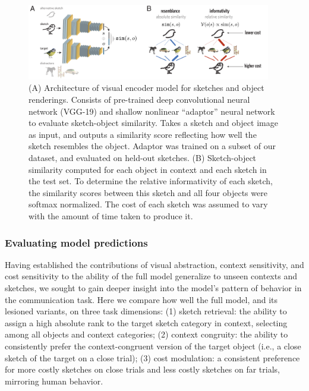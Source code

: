\documentclass[9pt,twocolumn,twoside]{pnas-new}
\begin{document}
\begin{figure}[htbp]
\centering
\includegraphics[width=0.95\textwidth]{figures/4_model_schematic.pdf}
\caption{(A) Architecture of visual encoder model for sketches and object renderings. Consists of pre-trained deep convolutional neural network (VGG-19) and shallow nonlinear ``adaptor'' neural network to evaluate sketch-object similarity. Takes a sketch and object image as input, and outputs a similarity score reflecting how well the sketch resembles the object. Adaptor was trained on a subset of our dataset, and evaluated on held-out sketches. (B) Sketch-object similarity computed for each object in context and each sketch in the test set. To determine the relative informativity of each sketch, the similarity scores between this sketch and all four objects were softmax normalized. The cost of each sketch was assumed to vary with the amount of time taken to produce it.}
\label{model_schematic}
\end{figure}



\subsubsection*{Evaluating model predictions}

Having established the contributions of visual abstraction, context sensitivity, and cost sensitivity to the ability of the full model generalize to unseen contexts and sketches, we sought to gain deeper insight into the model's pattern of behavior in the communication task. Here we compare how well the full model, and its lesioned variants, on three task dimensions: (1) sketch retrieval: the ability to assign a high absolute rank to the target sketch category in context, selecting among all objects and context categories; (2) context congruity: the ability to consistently prefer the context-congruent version of the target object (i.e., a close sketch of the target on a close trial); (3) cost modulation: a consistent preference for more costly sketches on close trials and less costly sketches on far trials, mirroring human behavior.
\end{document}
